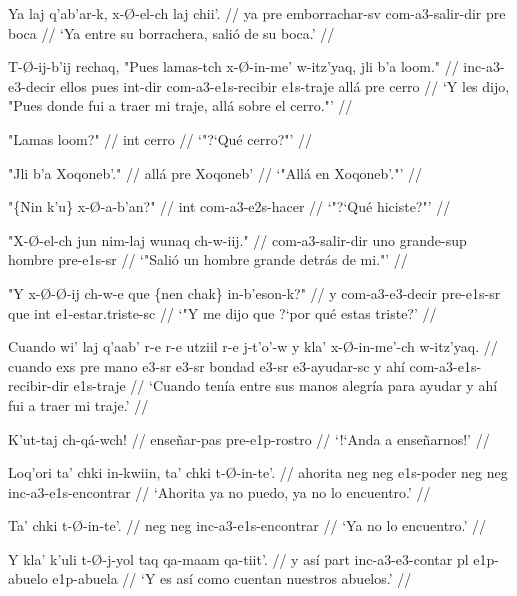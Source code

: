\documentclass[12pt]{article}
\begin{document}
\ex
\begingl
  \gla  Ya laj q'ab'ar-k, x-\O-el-ch laj chii'. //
  \glb ya pre emborrachar-sv com-a3-salir-dir pre boca //
  \glft `Ya entre su borrachera, sali\'o de su boca.' //
\endgl
\xe

\ex
\begingl
  \gla  T-\O-ij-b'ij rechaq, "Pues lamas-tch x-\O-in-me' w-itz'yaq, jli b'a loom." //
  \glb inc-a3-e3-decir ellos pues int-dir com-a3-e1s-recibir e1s-traje all\'a pre cerro //
  \glft `Y les dijo, "Pues donde fui a traer mi traje, all\'a sobre el cerro."' //
\endgl
\xe

\ex
\begingl
  \gla  "Lamas loom?" //
  \glb int cerro //
  \glft `"?`Qu\'e cerro?"' //
\endgl
\xe

\ex
\begingl
  \gla  "Jli b'a Xoqoneb'." //
  \glb  all\'a pre Xoqoneb' //
  \glft `"All\'a en Xoqoneb'."' //
\endgl
\xe

\ex
\begingl
  \gla  "\{Nin k'u\} x-\O-a-b'an?" //
  \glb  int com-a3-e2s-hacer //
  \glft `"?`Qu\'e hiciste?"' //
\endgl
\xe

\ex
\begingl
  \gla "X-\O-el-ch jun nim-laj wunaq ch-w-iij." //
  \glb com-a3-salir-dir uno grande-sup hombre pre-e1s-sr //
  \glft `"Sali\'o un hombre grande detr\'as de mi."' //
\endgl
\xe


\ex
\begingl
  \gla  "Y x-\O-\O-ij ch-w-e que \{nen chak\} in-b'eson-k?" //
  \glb  y com-a3-e3-decir pre-e1s-sr que int e1-estar.triste-sc  //
  \glft `"Y me dijo que ?`por qu\'e estas triste?' //
\endgl
\xe

\ex
\begingl
  \gla  Cuando wi' laj q'aab' r-e r-e utziil r-e j-t'o'-w y kla' x-\O-in-me'-ch w-itz'yaq. //
  \glb  cuando exs pre mano e3-sr e3-sr bondad e3-sr e3-ayudar-sc y ah\'i com-a3-e1s-recibir-dir e1s-traje //
  \glft `Cuando ten\'ia entre sus manos alegr\'ia para ayudar y ah\'i fui a traer mi traje.' //
\endgl
\xe



\ex
\begingl
  \gla  K'ut-taj ch-q\'a-wch! //
  \glb ense\~nar-pas pre-e1p-rostro //
  \glft `!`Anda a ense\~narnos!' //
\endgl
\xe

\ex
\begingl
  \gla  Loq'ori ta' chki in-kwiin, ta' chki t-\O-in-te'. //
  \glb  ahorita neg neg e1s-poder neg neg inc-a3-e1s-encontrar //
  \glft `Ahorita ya no puedo, ya no lo encuentro.' //
\endgl
\xe

\ex
\begingl
  \gla  Ta' chki t-\O-in-te'. //
  \glb  neg neg inc-a3-e1s-encontrar //
  \glft `Ya no lo encuentro.' //
\endgl
\xe


\ex
\begingl
  \gla  Y kla' k'uli t-\O-j-yol taq qa-maam qa-tiit'. //
  \glb  y as\'i part inc-a3-e3-contar pl e1p-abuelo e1p-abuela //
  \glft `Y es as\'i como cuentan nuestros abuelos.' //
\endgl
\xe
\end{document}
